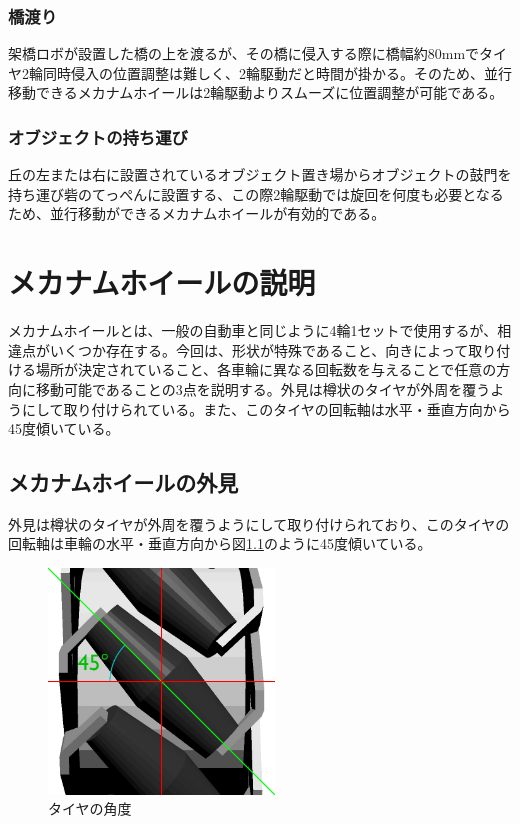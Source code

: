 \documentclass[12pt,oneside]{sotsuken_paper}
\begin{document}
		\subsection{橋渡り}
		架橋ロボが設置した橋の上を渡るが、その橋に侵入する際に橋幅約80mmでタイヤ2輪同時侵入の位置調整は難しく、2輪駆動だと時間が掛かる。そのため、並行移動できるメカナムホイールは2輪駆動よりスムーズに位置調整が可能である。

		\subsection{オブジェクトの持ち運び}
		丘の左または右に設置されているオブジェクト置き場からオブジェクトの鼓門を持ち運び砦のてっぺんに設置する、この際2輪駆動では旋回を何度も必要となるため、並行移動ができるメカナムホイールが有効的である。

\chapter{メカナムホイールの説明}
メカナムホイールとは、一般の自動車と同じように4輪1セットで使用するが、相違点がいくつか存在する。今回は、形状が特殊であること、向きによって取り付ける場所が決定されていること、各車輪に異なる回転数を与えることで任意の方向に移動可能であることの3点を説明する。外見は樽状のタイヤが外周を覆うようにして取り付けられている。また、このタイヤの回転軸は水平・垂直方向から45度傾いている。

	\section{メカナムホイールの外見}
	外見は樽状のタイヤが外周を覆うようにして取り付けられており、このタイヤの回転軸は車輪の水平・垂直方向から図\ref{角度}のように45度傾いている。

	\begin{figure}[htp]
		\begin{center}
			\includegraphics[width=60mm]{Image/角度.jpg}
			\caption{タイヤの角度}
			\label{角度}
		\end{center}
	\end{figure}
\end{document}
